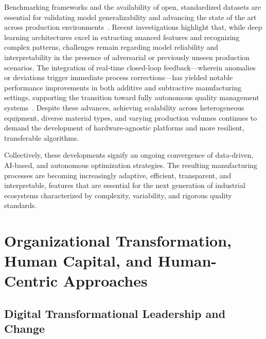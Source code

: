 \documentclass[sigconf]{acmart}
\begin{document}
Benchmarking frameworks and the availability of open, standardized datasets are essential for validating model generalizability and advancing the state of the art across production environments~\cite{ref46, ref48, ref53, ref95}. Recent investigations highlight that, while deep learning architectures excel in extracting nuanced features and recognizing complex patterns, challenges remain regarding model reliability and interpretability in the presence of adversarial or previously unseen production scenarios. The integration of real-time closed-loop feedback—wherein anomalies or deviations trigger immediate process corrections—has yielded notable performance improvements in both additive and subtractive manufacturing settings, supporting the transition toward fully autonomous quality management systems~\cite{ref44, ref48, ref58}. Despite these advances, achieving scalability across heterogeneous equipment, diverse material types, and varying production volumes continues to demand the development of hardware-agnostic platforms and more resilient, transferable algorithms.

Collectively, these developments signify an ongoing convergence of data-driven, AI-based, and autonomous optimization strategies. The resulting manufacturing processes are becoming increasingly adaptive, efficient, transparent, and interpretable, features that are essential for the next generation of industrial ecosystems characterized by complexity, variability, and rigorous quality standards.

\section{Organizational Transformation, Human Capital, and Human-Centric Approaches}

\subsection{Digital Transformational Leadership and Change}
\end{document}
